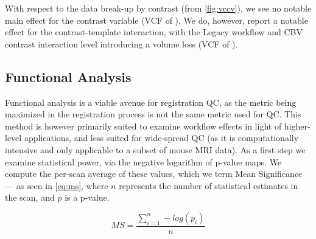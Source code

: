 With respect to the data break-up by contrast (from \cref{fig:vccv}), we see no notable main effect for the contrast variable
(VCF of ).
We do, however, report a notable effect for the contrast-template interaction, with the Legacy workflow and CBV contrast interaction level introducing a volume loss
(VCF of ).

\subsection{Functional Analysis}

Functional analysis is a viable avenue for registration QC, as the metric being maximized in the registration process is not the same metric used for QC.
This method is however primarily suited to examine workflow effects in light of higher-level applications, and less suited for wide-spread QC (as it is computationally intensive and only applicable to a subset of mouse MRI data).
As a first step we examine statistical power, via the negative logarithm of p-value maps.
We compute the per-scan average of these values, which we term Mean Significance --- as seen in \cref{eq:ms}, where $n$ represents the number of statistical estimates in the scan, and $p$ is a p-value.

\begin{equation} \label{eq:ms}
        M\!S = \frac{\sum_{i=1}^n -log(p_i)}{n}
\end{equation}

\begin{sansmath}
\end{sansmath}

